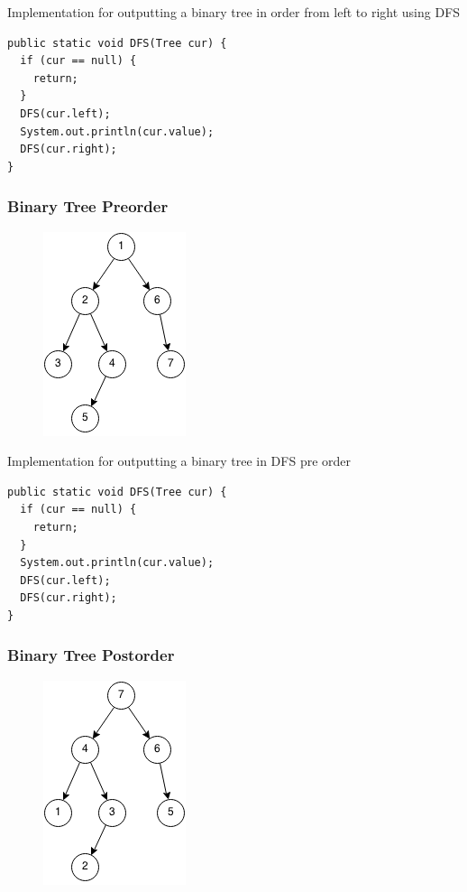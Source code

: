\documentclass[11pt,oneside]{book}
\makeatletter
\def\maxwidth#1{\ifdim\Gin@nat@width>#1 #1\else\Gin@nat@width\fi}
\makeatother
\begin{document}
Implementation for outputting a binary tree in order from left to right using DFS

\begin{lstlisting}
public static void DFS(Tree cur) {
  if (cur == null) {
    return;
  }
  DFS(cur.left);
  System.out.println(cur.value);
  DFS(cur.right);
}
\end{lstlisting}

\subsubsection{Binary Tree Preorder}

\vspace{5px}\begin{figure}[H]\centering
        \includegraphics[width=0.66\maxwidth{\textwidth}]{dfs-preorder.png}
        \end{figure}

Implementation for outputting a binary tree in DFS pre order

\begin{lstlisting}
public static void DFS(Tree cur) {
  if (cur == null) {
    return;
  }
  System.out.println(cur.value);
  DFS(cur.left);
  DFS(cur.right);
}
\end{lstlisting}

\subsubsection{Binary Tree Postorder}

\vspace{5px}\begin{figure}[H]\centering
        \includegraphics[width=0.66\maxwidth{\textwidth}]{dfs-postorder.png}
        \end{figure}
\end{document}
